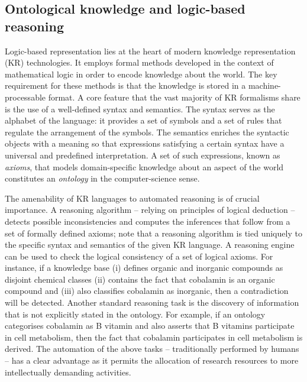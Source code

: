 \documentclass[10pt]{bmc_article}
\newenvironment{bmcformat}{\baselineskip20pt\sloppy\setboolean{publ}{false}}{\baselineskip20pt\sloppy}
\begin{document}
\begin{bmcformat}
\subsection*{Ontological knowledge and logic-based reasoning}
\label{sec:backlogic}

Logic-based representation lies at the heart of modern knowledge representation (KR) technologies. It employs formal methods developed in the context of mathematical logic in order to encode knowledge about the world. The key requirement for these methods is that the knowledge is stored in a machine-processable format. A core feature that the vast majority of KR formalisms share is the use of a well-defined syntax and semantics. The syntax serves as the alphabet of the language: it provides a set of symbols and a set of rules that regulate the arrangement of the symbols. The semantics enriches the syntactic objects with a meaning so that expressions satisfying a certain syntax have a universal and predefined interpretation. A set of such expressions, known as \textit{axioms}, that models domain-specific knowledge about an aspect of the world constitutes an \emph{ontology} in the computer-science sense. 

The amenability of KR languages to automated reasoning is of crucial importance. A reasoning algorithm -- relying on principles of logical deduction -- detects possible inconsistencies and computes the inferences that follow from a set of formally defined axioms; note that a reasoning algorithm is tied uniquely to the specific syntax and semantics of the given KR language. A reasoning engine can be used to check the logical consistency of a set of logical axioms. For instance, if a knowledge base (i) defines organic and inorganic compounds as disjoint chemical classes (ii) contains the fact that cobalamin is an organic compound and (iii) also classifies cobalamin as inorganic, then a contradiction will be detected. Another standard reasoning task is the discovery of information that is not explicitly stated in the ontology. For example, if an ontology categorises cobalamin as B vitamin and also asserts that B vitamins participate in cell metabolism, then the fact that cobalamin participates in cell metabolism is derived. The automation of the above tasks -- traditionally performed by humans -- has a clear advantage as it permits the allocation of research resources to more intellectually demanding activities.


\end{bmcformat}
\end{document}
